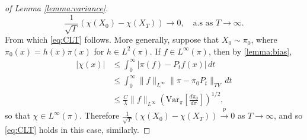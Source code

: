 \begin{proof}[of Lemma \ref{lemma:variance}]
$$
	\frac{1}{\sqrt{T}}\left(\chi(X_0) - \chi(X_T)\right) \rightarrow 0,\quad \mbox{a.s as } T \rightarrow \infty.
$$
From which \eqref{eq:CLT} follows.  More generally, suppose that $X_0 \sim \pi_0$, where $\pi_0(x) = h(x)\pi(x)$ for $h \in L^2(\pi)$.  If $f \in L^\infty(\pi)$, then by \eqref{lemma:bias},
\begin{align*}
	|\chi(x)| &\leq \int_0^\infty |\pi(f) - P_t f(x)|\,dt \\
			  &\leq \int_0^\infty \lVert f\rVert_{L^\infty}\lVert\pi - \pi_0 P_t\rVert_{TV}\,dt \\
			  & \leq \frac{C}{\lambda }\lVert f\rVert_{L^\infty}\left(\mbox{Var}_{\pi}\left[\frac{d\pi_0}{d\pi}\right]\right)^{1/2},
\end{align*} 
so that $\chi \in L^\infty(\pi)$.  Therefore $\frac{1}{\sqrt{T}}(\chi(X_0)- \chi(X_T)) \xrightarrow{p} 0$ as $T \rightarrow \infty$, and so \eqref{eq:CLT} holds in this case, similarly.
\end{proof}
